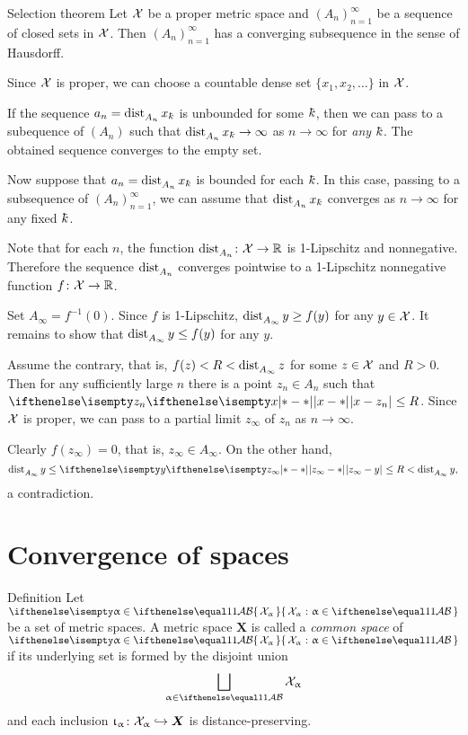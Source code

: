 \begin{thm}{Selection theorem}
Let $\mathcal{X}$ be a proper metric  space
and $(A_n)_{n=1}^\infty$ be a sequence of closed sets in $\mathcal{X}$.
Then  $(A_n)_{n=1}^\infty$ has a converging subsequence in the sense of Hausdorff.
\end{thm}

Since $\mathcal{X}$ is proper,
we can choose a countable dense set $\{x_1,x_2, \dots\}$ in $\mathcal{X}$.

If the sequence $a_n=\distfun{A_n}x_\kay$ is unbounded for some $\kay$,
then we can pass to a subequence of $(A_n)$ such that 
$\distfun{A_n}x_\kay\to \infty$ as $n\to\infty$ for \emph{any} $\kay$.
The obtained sequence converges to the empty set.

Now suppose that $a_n=\distfun{A_n}x_\kay$ is bounded for each $\kay$. 
In this case, passing to a subsequence of $(A_n)_{n=1}^\infty$,
we can assume that $\distfun{A_n}x_\kay$ converges as $n\to\infty$ for any fixed $\kay$.

Note that for each $n$, the function $\distfun{A_n}\:\spc{X}\to\RR$ is 1-Lipschitz and nonnegative.
Therefore the sequence $\mathop{\rm dist}\nolimits_{A_n}^{{}}$ converges pointwise to a 1-Lipschitz nonnegative function $f\:\spc{X}\to\RR$.

Set $A_\infty=f^{-1}(0)$.
Since $f$ is 1-Lipschitz, 
$\distfun{A_\infty}y\ge f(y)$ for any $y\in \spc{X}$.
It remains to show that $\distfun{A_\infty}y\le f(y)$ for any $y$.

Assume the  contrary,
that is, $f(z)<R<\mathop{\rm dist}\nolimits_{A_\infty}^{{}}z$ for some $z\in \spc{X}$ and $R>0$.
Then for any sufficiently large $n$ there is a point $z_n\in A_n$ such that
$\dist{x}{z_n}{}\le R$.
Since $\mathcal{X}$ is proper, we can pass to a partial limit $z_\infty$ of $z_n$ as $n\to\infty$.

Clearly  $f(z_\infty)=0$, that is, $z_\infty\in A_\infty$.
On the other hand, 
\[\distfun{A_\infty}y\le\dist{z_\infty}{y}{}\le R<\distfun{A_\infty}y,\] 
a contradiction.
\qeds

\section{Convergence of spaces}

\begin{thm}{Definition}\label{def:comp-metr}
Let $\set{\spc{X}_\alpha}{\alpha\in\IndexSet}$ be a set of metric spaces.
A metric space $\bm{X}$
is called a \emph{common space} of $\set{\spc{X}_\alpha}{\alpha\in\IndexSet}$ if its underlying set is formed by the disjoint union
$$\bigsqcup_{\alpha\in\IndexSet} \spc{X}_\alpha$$ 
and each inclusion $\iota_\alpha\:\spc{X}_\alpha\hookrightarrow\bm{X}$
is distance-preserving.
\end{thm}

